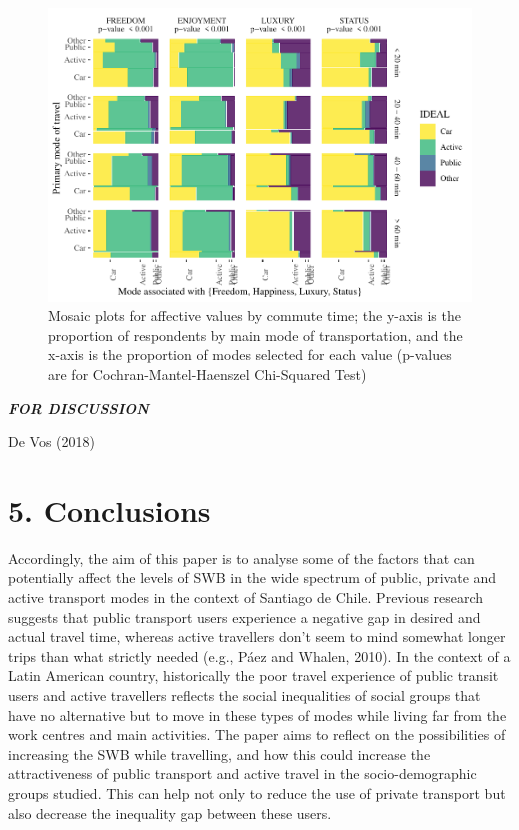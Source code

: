 \documentclass[]{elsarticle} %
\makeatletter
\def\maxwidth{\ifdim\Gin@nat@width>\linewidth\linewidth
\else\Gin@nat@width\fi}
\let\Oldincludegraphics\includegraphics
\renewcommand{\includegraphics}[1]{\Oldincludegraphics[width=\maxwidth]{#1}}
\makeatother
\begin{document}
\begin{figure}
\centering
\includegraphics{Dissonance_Santiago_v1_files/figure-latex/figure-mosaic-plots-by-attribute-and-time-1.pdf}
\caption{\label{fig:mosaic-plots-by-travel-time}Mosaic plots for
affective values by commute time; the y-axis is the proportion of
respondents by main mode of transportation, and the x-axis is the
proportion of modes selected for each value (p-values are for
Cochran-Mantel-Haenszel Chi-Squared Test)}
\end{figure}

\textbf{\emph{FOR DISCUSSION}}

De Vos (2018)

\hypertarget{conclusions}{%
\section{5. Conclusions}\label{conclusions}}

Accordingly, the aim of this paper is to analyse some of the factors
that can potentially affect the levels of SWB in the wide spectrum of
public, private and active transport modes in the context of Santiago de
Chile. Previous research suggests that public transport users experience
a negative gap in desired and actual travel time, whereas active
travellers don't seem to mind somewhat longer trips than what strictly
needed (e.g., Páez and Whalen, 2010). In the context of a Latin American
country, historically the poor travel experience of public transit users
and active travellers reflects the social inequalities of social groups
that have no alternative but to move in these types of modes while
living far from the work centres and main activities. The paper aims to
reflect on the possibilities of increasing the SWB while travelling, and
how this could increase the attractiveness of public transport and
active travel in the socio-demographic groups studied. This can help not
only to reduce the use of private transport but also decrease the
inequality gap between these users.
\end{document}
